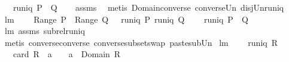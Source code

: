 \begin{isabellebody}
\ \ \ {\isachardoublequoteopen}runiq\ {\isacharparenleft}{\isacharparenleft}P\ {\isasymunion}\ Q{\isacharparenright}{\isacharcircum}{\isacharminus}{}{\isacharparenright}{\isachardoublequoteclose}\isanewline
%
\isadelimproof
\ \ %
\endisadelimproof
%
\isatagproof
{}\isamarkupfalse%
\ assms\ \isamarkupfalse%
\ {\isacharparenleft}metis\ Domain{\isacharunderscore}converse\ converse{\isacharunderscore}Un\ disj{\isacharunderscore}Un{\isacharunderscore}runiq{\isacharparenright}%
\endisatagproof
{\isafoldproof}%
%
\isadelimproof
\isanewline
%
\endisadelimproof
\isanewline
{}\isamarkupfalse%
\ lm{}{}{}{\isacharcolon}\ \isanewline
\ \ \ {\isachardoublequoteopen}{\isacharparenleft}Range\ P{\isacharparenright}\ {\isasyminter}\ {\isacharparenleft}Range\ Q{\isacharparenright}\ {\isacharequal}\ {\isacharbraceleft}{\isacharbraceright}{\isachardoublequoteclose}\ {\isachardoublequoteopen}runiq\ {\isacharparenleft}P{\isacharcircum}{\isacharminus}{}{\isacharparenright}{\isachardoublequoteclose}\ {\isachardoublequoteopen}runiq\ {\isacharparenleft}Q{\isacharcircum}{\isacharminus}{}{\isacharparenright}{\isachardoublequoteclose}\ \isanewline
\ \ \ {\isachardoublequoteopen}runiq\ {\isacharparenleft}{\isacharparenleft}P\ {\isacharplus}{\isacharasterisk}\ Q{\isacharparenright}{\isacharcircum}{\isacharminus}{}{\isacharparenright}{\isachardoublequoteclose}\isanewline
%
\isadelimproof
\ \ %
\endisadelimproof
%
\isatagproof
{}\isamarkupfalse%
\ lm{}{}{}\ assms\ subrel{\isacharunderscore}runiq\ \isamarkupfalse%
\ {\isacharparenleft}metis\ converse{\isacharunderscore}converse\ converse{\isacharunderscore}subset{\isacharunderscore}swap\ paste{\isacharunderscore}sub{\isacharunderscore}Un{\isacharparenright}%
\endisatagproof
{\isafoldproof}%
%
\isadelimproof
\isanewline
%
\endisadelimproof
\isanewline
{}\isamarkupfalse%
\ lm{}{}{}{\isacharcolon}\ \isanewline
\ \ \ {\isachardoublequoteopen}runiq\ R{\isachardoublequoteclose}\ \isanewline
\ \ \ {\isachardoublequoteopen}card\ {\isacharparenleft}R\ {\isacharbackquote}{\isacharbackquote}\ {\isacharbraceleft}a{\isacharbraceright}{\isacharparenright}\ {\isacharequal}\ {}\ {\isasymlongleftrightarrow}\ a\ {\isasymin}\ Domain\ R{\isachardoublequoteclose}\isanewline
%
\isadelimproof
\ \ %
\endisadelimproof

\end{isabellebody}
